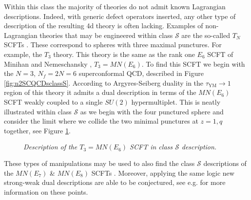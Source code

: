 \documentclass[main.tex]{subfiles}
\begin{document}
Within this class the majority of theories do not admit known Lagrangian descriptions.  Indeed, with generic defect operators inserted, any other type of description of the resulting 4d theory is often lacking.  
Examples of non-Lagrangian theories that may be engineered within class $\mathcal{S}$ are the so-called $T_N$ SCFTs \cite{Gaiotto:2009we}.  These correspond to spheres with three maximal punctures.  For example, the $T_3$ theory.  This theory is the same as the rank one $E_6$ SCFT of Minihan and Nemeschansky \cite{Minahan:1996fg}, $T_3=MN(E_6)$.  To find this SCFT we begin with the $N=3$, $N_f=2N=6$ superconformal QCD, described in Figure \ref{fig:n2SCQCDsclassS}.  According to Argyres-Seiberg duality  \cite{Argyres:2007cn} in the $\tau_{\text{YM}}\to1$ region of this theory it admits a dual description in terms of the $MN(E_6)$ SCFT weakly coupled to a single $SU(2)$ hypermultiplet.  This is neatly illustrated within class $\mathcal{S}$ as we begin with the four punctured sphere and consider the limit where we collide the two minimal punctures at $z=1,q$ together, see Figure \ref{fig:T3sclassS}.
\begin{figure}
\centering
{}
\caption{\textit{Description of the $T_3=MN(E_6)$ SCFT in class $\mathcal{S}$ description.}}
\label{fig:T3sclassS}
\end{figure} 
These types of manipulations may be used to also find the class $\mathcal{S}$ descriptions of the $MN(E_7)$ \& $MN(E_8)$ SCFTs \cite{Minahan:1996cj}.  Moreover, applying the same logic new strong-weak dual descriptions are able to be conjectured, see e.g.  \cite{Tachikawa:2013kta} for more information on these points.
\end{document}

